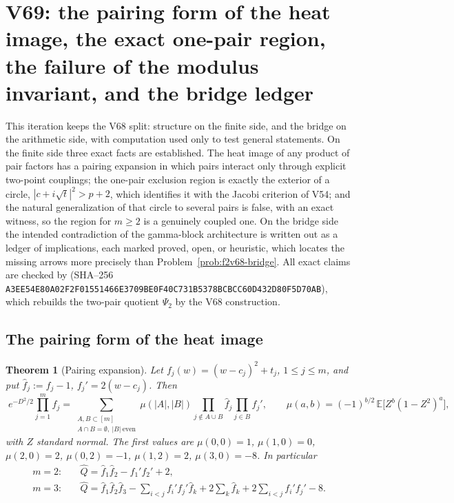 \documentclass[11pt]{article}
\newtheorem{theorem}{Theorem}[section]
\theoremstyle{definition}
\theoremstyle{remark}
\begin{document}
\section{V69: the pairing form of the heat image, the exact one-pair region, the failure of the modulus invariant, and the bridge ledger}
\label{sec:f2v69-pairing}
\begingroup
\setcounter{equation}{0}
\renewcommand{\theequation}{N69.\arabic{equation}}
\renewcommand{\theHequation}{f2v69.\arabic{equation}}

This iteration keeps the V68 split: structure on the finite side, and the
bridge on the arithmetic side, with computation used only to test general
statements.  On the finite side three exact facts are established.  The
heat image of any product of pair factors has a pairing expansion in which
pairs interact only through explicit two-point couplings; the one-pair
exclusion region is exactly the exterior of a circle, \(|c+i\sqrt t|^2>p+2\),
which identifies it with the Jacobi criterion of V54; and the natural
generalization of that circle to several pairs is false, with an exact
witness, so the region for \(m\ge2\) is a genuinely coupled one.  On the
bridge side the intended contradiction of the gamma-block architecture is
written out as a ledger of implications, each marked proved, open, or
heuristic, which locates the missing arrows more precisely than
Problem~\ref{prob:f2v68-bridge}.  All exact claims are checked by
 (SHA--256
\texttt{A3EE54E80A02F2F01551466E3709BE0F}\allowbreak\texttt{40C731B5378BCBCC60D432D80F5D70AB}), which rebuilds the two-pair
quotient \(\Psi_2\) by the V68 construction.

\subsection{The pairing form of the heat image}

\begin{theorem}[Pairing expansion]
\label{thm:f2v69-pairing}
Let \(f_j(w)=(w-c_j)^2+t_j\), \(1\le j\le m\), and put
\(\widehat f_j:=f_j-1\), \(f_j'=2(w-c_j)\).  Then
\begin{equation}
 \boxed{\;e^{-D^2/2}\prod_{j=1}^mf_j
 =\sum_{\substack{A,B\subset[m]\\ A\cap B=\emptyset,\ |B|\ \mathrm{even}}}
 \mu(|A|,|B|)\prod_{j\notin A\cup B}\widehat f_j\prod_{j\in B}f_j',\qquad
 \mu(a,b)=(-1)^{b/2}\,\mathbb E\bigl[Z^b(1-Z^2)^a\bigr],}
 \label{eq:f2v69-pairing}
\end{equation}
with \(Z\) standard normal.  The first values are \(\mu(0,0)=1\),
\(\mu(1,0)=0\), \(\mu(2,0)=2\), \(\mu(0,2)=-1\), \(\mu(1,2)=2\),
\(\mu(3,0)=-8\).  In particular
\begin{align}
 m=2:&\quad \widehat Q=\widehat f_1\widehat f_2-f_1'f_2'+2,
 \label{eq:f2v69-m2}\\
 m=3:&\quad \widehat Q=\widehat f_1\widehat f_2\widehat f_3
 -\sum_{i<j}f_i'f_j'\widehat f_k+2\sum_k\widehat f_k+2\sum_{i<j}f_i'f_j'-8 .
 \label{eq:f2v69-m3}
\end{align}
\end{theorem}
\end{document}
